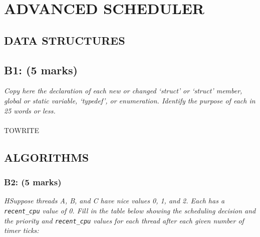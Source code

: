 \documentclass{article}
\begin{document}
\section{ADVANCED SCHEDULER}

\subsection{DATA STRUCTURES}

\subsection*{B1: (5 marks) }

\textit{Copy here the declaration of each new or changed ‘struct’ or ‘struct’ member, global or static variable, ‘typedef’, or enumeration. Identify the purpose of each in 25 words or less.}
\\ \\
TOWRITE


\subsection{ALGORITHMS}

\subsubsection*{B2: (5 marks) }
\textit{HSuppose threads A, B, and C have nice values 0, 1, and 2.  Each has a \texttt{recent\_cpu} value of 0.  Fill in the table below showing the scheduling decision and the priority and \texttt{recent\_cpu} values for each thread after each given number of timer ticks:}
\end{document}
